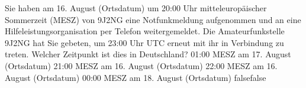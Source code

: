     {Sie haben am 16. August (Ortsdatum) um 20:00 Uhr mitteleuropäischer Sommerzeit (MESZ) von 9J2NG eine Notfunkmeldung aufgenommen und an eine Hilfeleistungsorganisation per Telefon weitergemeldet. Die Amateurfunkstelle 9J2NG hat Sie gebeten, um 23:00 Uhr UTC erneut mit ihr in Verbindung zu treten. Welcher Zeitpunkt ist dies in Deutschland?}
    {01:00 MESZ am 17. August (Ortsdatum)}
    {21:00 MESZ am 16. August (Ortsdatum)}
    {22:00 MESZ am 16. August (Ortsdatum)}
    {00:00 MESZ am 18. August (Ortsdatum)}
    {false}{false}